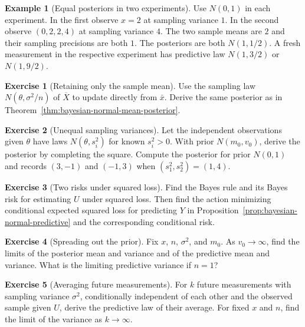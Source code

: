 \documentclass[11pt,oneside]{book}
\theoremstyle{definition}
\newtheorem{example}[theorem]{Example}
\newtheorem{exercise}{Exercise}[section]
\theoremstyle{remark}
\begin{document}
\begin{example}[Equal posteriors in two experiments]
\label{ex:bayesian-normal-equal-precision}
Use $N(0,1)$ in each experiment. In the first observe $x=2$ at
sampling variance $1$. In the second observe $(0,2,2,4)$ at
sampling variance $4$. The two sample means are $2$ and their
sampling precisions are both $1$. The posteriors are both
$N(1,1/2)$. A fresh measurement in the respective experiment
has predictive law $N(1,3/2)$ or $N(1,9/2)$.
\end{example}

\begin{exercise}[Retaining only the sample mean]
\label{exer:bayesian-normal-mean-only}
Use the sampling law $N(\theta,\sigma^2/n)$ of $\overline X$
to update directly from $\bar x$. Derive the same posterior
as in Theorem~\ref{thm:bayesian-normal-mean-posterior}.
\end{exercise}

\begin{exercise}[Unequal sampling variances]
\label{exer:bayesian-normal-unequal-variance}
Let the independent observations given $\theta$ have laws
$N(\theta,s_i^2)$ for known $s_i^2>0$. With prior $N(m_0,v_0)$,
derive the posterior by completing the square. Compute the
posterior for prior $N(0,1)$ and records $(3,-1)$ and $(-1,3)$
when $(s_1^2,s_2^2)=(1,4)$.
\end{exercise}

\begin{exercise}[Two risks under squared loss]
\label{exer:bayesian-normal-estimate-and-predict}
Find the Bayes rule and its Bayes risk for estimating $U$ under
squared loss. Then find the action minimizing conditional expected
squared loss for predicting $Y$ in
Proposition~\ref{prop:bayesian-normal-predictive} and the
corresponding conditional risk.
\end{exercise}

\begin{exercise}[Spreading out the prior]
\label{exer:bayesian-normal-diffuse-limit}
Fix $x$, $n$, $\sigma^2$, and $m_0$. As $v_0\to\infty$,
find the limits of the posterior mean and variance and of the
predictive mean and variance. What is the limiting predictive
variance if $n=1$?
\end{exercise}

\begin{exercise}[Averaging future measurements]
\label{exer:bayesian-normal-future-average}
For $k$ future measurements with sampling variance $\sigma^2$,
conditionally independent of each other and the observed sample
given $U$, derive the predictive law of their average. For fixed
$x$ and $n$, find the limit of the variance as $k\to\infty$.
\end{exercise}
\end{document}
